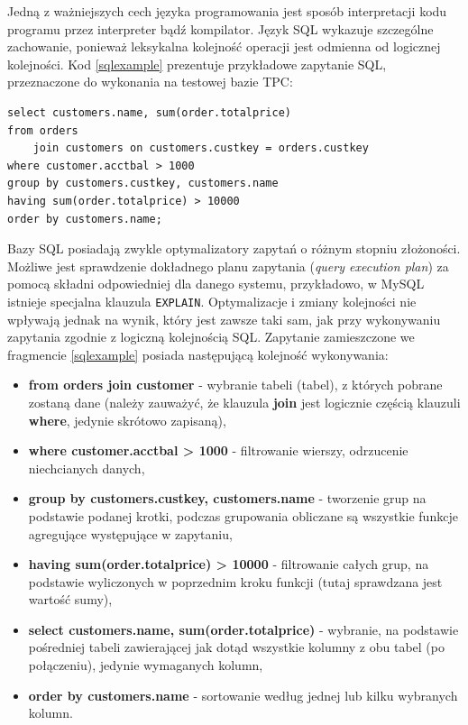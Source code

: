 \documentclass[12pt,twoside,openright]{extarticle}
\begin{document}
    Jedną z ważniejszych cech języka programowania jest sposób interpretacji kodu programu przez interpreter bądź kompilator. Język SQL wykazuje szczególne zachowanie, ponieważ leksykalna kolejność operacji jest odmienna od logicznej kolejności. Kod \ref{sqlexample} prezentuje przykładowe zapytanie SQL, przeznaczone do wykonania na testowej bazie TPC:


\begin{lstlisting}[label=sqlexample, caption=Przykład kolejności wykonywania zapytania SQL]
select customers.name, sum(order.totalprice)
from orders 
    join customers on customers.custkey = orders.custkey
where customer.acctbal > 1000
group by customers.custkey, customers.name
having sum(order.totalprice) > 10000
order by customers.name;
\end{lstlisting}

    Bazy SQL posiadają zwykle optymalizatory zapytań o różnym stopniu złożoności. Możliwe jest sprawdzenie dokładnego planu zapytania (\textit{query execution plan}) za pomocą składni odpowiedniej dla danego systemu, przykładowo, w MySQL istnieje specjalna klauzula \texttt{EXPLAIN}. Optymalizacje i zmiany kolejności nie wpływają jednak na wynik, który jest zawsze taki sam, jak przy wykonywaniu zapytania zgodnie z logiczną kolejnością SQL. Zapytanie zamieszczone we fragmencie \ref{sqlexample} posiada następującą kolejność wykonywania:

\begin{itemize}
    \item \textbf{from orders join customer} - wybranie tabeli (tabel), z których pobrane zostaną dane (należy zauważyć, że klauzula \textbf{join} jest logicznie częścią klauzuli \textbf{where}, jedynie skrótowo zapisaną),
    \item \textbf{where customer.acctbal > 1000} - filtrowanie wierszy, odrzucenie niechcianych danych,
    \item \textbf{group by customers.custkey, customers.name} - tworzenie grup na podstawie podanej krotki, podczas grupowania obliczane są wszystkie funkcje agregujące występujące w zapytaniu,
    \item \textbf{having sum(order.totalprice) > 10000} - filtrowanie całych grup, na podstawie wyliczonych w poprzednim kroku funkcji (tutaj sprawdzana jest wartość sumy),
    \item \textbf{select customers.name, sum(order.totalprice)} - wybranie, na podstawie pośredniej tabeli zawierającej jak dotąd wszystkie kolumny z obu tabel (po połączeniu), jedynie wymaganych kolumn,
    \item \textbf{order by customers.name} - sortowanie według jednej lub kilku wybranych kolumn.
\end{itemize}
\end{document}
